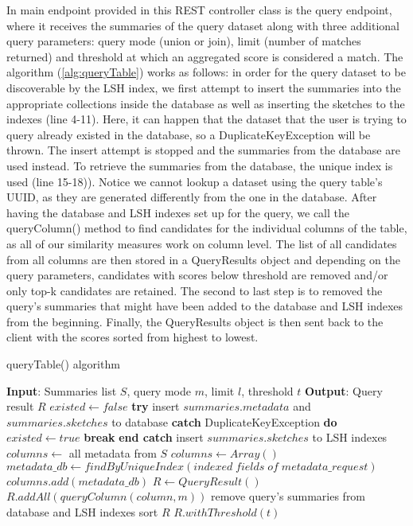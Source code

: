 In main endpoint provided in this REST controller class is the query endpoint, where it receives the summaries of the query dataset along with three additional query parameters: query mode (union or join), limit (number of matches returned) and threshold at which an aggregated score is considered a match. The algorithm (\ref{alg:queryTable}) works as follows: in order for the query dataset to be discoverable by the LSH index, we first attempt to insert the summaries into the appropriate collections inside the database as well as inserting the sketches to the indexes (line 4-11). Here, it can happen that the dataset that the user is trying to query already existed in the database, so a DuplicateKeyException will be thrown. The insert attempt is stopped and the summaries from the database are used instead. To retrieve the summaries from the database, the unique index is used (line 15-18)). Notice we cannot lookup a dataset using the query table's UUID, as they are generated differently from the one in the database. After having the database and LSH indexes set up for the query, we call the queryColumn() method to find candidates for the individual columns of the table, as all of our similarity measures work on column level. The list of all candidates from all columns are then stored in a QueryResults object and depending on the query parameters, candidates with scores below threshold are removed and/or only top-k candidates are retained. The second to last step is to removed the query's summaries that might have been added to the database and LSH indexes from the beginning. Finally, the QueryResults object is then sent back to the client with the scores sorted from highest to lowest.

\begin{algorithm}
    \caption{queryTable() algorithm}
    \label{alg:queryTable}
    \begin{algorithmic} [1]
\STATE \textbf{Input}: Summaries list $S$, query mode $m$, limit $l$, threshold $t$ 
\STATE \textbf{Output}: Query result $R$
\STATE $existed \gets false$
\STATE \textbf{try} insert $summaries.metadata$ and $summaries.sketches$ to database
\STATE \textbf{catch} DuplicateKeyException \textbf{do}
\STATE \; \; $existed \gets true$
\STATE \; \; \textbf{break}
\STATE \textbf{end catch}
\STATE insert $summaries.sketches$ to LSH indexes
\ENDFOR
{}
\STATE $columns \gets$ all metadata from $S$
\ELSE
\STATE $columns \gets Array()$
\STATE $metadata\_db \gets findByUniqueIndex(indexed \; fields \; of \; metadata\_request)$
\STATE $columns.add(metadata\_db)$
\ENDFOR
\ENDIF
\STATE $R \gets QueryResult()$
\STATE $R.addAll(queryColumn(column, m))$
\ENDFOR
{}
\STATE remove query's summaries from database and LSH indexes
\ENDIF
\STATE sort $R$
\RETURN $R.withThreshold(t)$
    \end{algorithmic}
\end{algorithm}

